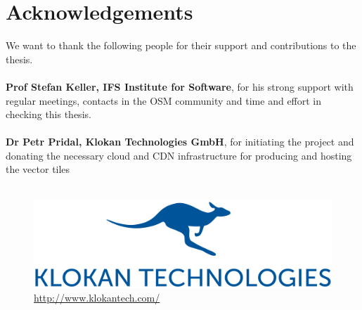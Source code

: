 

\bigskip


\begingroup

\let\clearpage\relax
\let\cleardoublepage\relax
\let\cleardoublepage\relax

\chapter*{Acknowledgements} %

We want to thank the following people for their support and contributions to the thesis.\\\\

\textbf{Prof Stefan Keller, IFS Institute for Software}, for his strong support with regular meetings, contacts in the OSM community and time and effort in checking this thesis.\\\\

\textbf{Dr Petr Pridal, Klokan Technologies GmbH}, for initiating the project and donating the necessary cloud and CDN infrastructure for producing and hosting the vector tiles\\\\

\begin{figure}[H]
  \centering
  \includegraphics[scale=0.3]{images/klokantech_logo.png}
  \caption*{\url{http://www.klokantech.com/}}
\end{figure}
\endgroup

